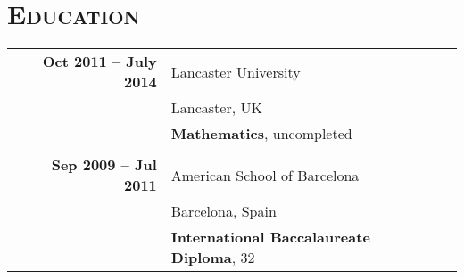 \documentclass[a4paper,10pt]{article} %
\begin{document}

\section{\textsc{Education}}
\begin{tabularx}{\textwidth}{XrlXr}
  &  \textbf{Oct 2011 -- July 2014} & Lancaster University & &\\
  &                                 & Lancaster, UK & & \\
  &                                 & \textbf{Mathematics}, uncompleted & &\\
\multicolumn{5}{c}{}\\ %
  &  \textbf{Sep 2009 -- Jul 2011}  & American School of Barcelona & &\\
  &                                 & Barcelona, Spain & &\\
  &                                 & \textbf{International Baccalaureate Diploma}, 32 & &\\
\end{tabularx}


\medskip
\end{document}
